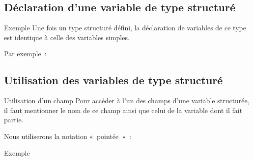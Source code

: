 \subsection{Déclaration d’une variable de type structuré}

\begin{frame}{Exemple}
	Une fois un type structuré défini, la
	déclaration de variables de ce type est identique à celle des variables
	simples. 
	
	\bigskip
	
	Par exemple~:

	\bigskip
	
\end{frame}

\subsection{Utilisation des variables de type structuré}

\begin{frame}{Utilisation d'un champ}
	Pour accéder à l’un des champs d’une variable structurée, il faut mentionner
	le nom de ce champ ainsi que celui de la variable dont il fait partie.
	
	\bigskip
	
	Nous utiliserons la notation «~pointée~»~:
	
	\bigskip

\end{frame}

\begin{frame}{Exemple}	
\end{frame}

